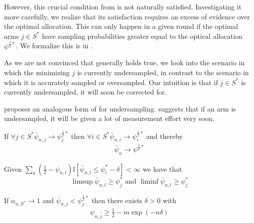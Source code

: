 However, this crucial condition from  is not naturally
satisfied. Investigating it more carefully, we realize that its satisfaction
requires an excess of evidence over the optimal allocation. This can only happen
in a given round if the optimal arms $j \in S^*$ have sampling probabilities
greater equal to the optical allocation $\psi^{\frac{1}{2}*}$. We formalize
this is in .

As we are not convinced that  generally holds true, we
look into the scenario in which the minimizing $j$ is currently undersampled, in
contrast to the scenario in which it is accurately sampled or oversampled. Our
intuition is that if $j \in S^*$ is currently undersampled, it will soon be
corrected for.

 proposes an analogous form of
 for undersampling.
 suggests that if an arm is undersampled, it will
be given a lot of measurement effort very soon.
\begin{lemma}\label{lemma:if_converged_then_converged}
  If $\forall j \in S^* \bar{\psi}_{n, j} \rightarrow \psi^{\frac{1}{2}*}_j$
  then $\forall i \in S^* \bar{\psi}_{n, i} \rightarrow \psi^{\frac{1}{2}*}_i$
  and thereby
  \begin{align}
    \bar{\psi}_n \rightarrow \psi^{\frac{1}{2}*}
  \end{align}
\end{lemma}
\begin{lemma}\label{lemma:limsup_undersampling}
  Given $\sum_n(\frac{1}{2} - \psi_{n, l}) \mathbb{I}[\bar{\psi}_{n, l} \leq
    \psi_l^* - \delta] < \infty$ we have that
  \[\limsup \bar{\psi}_{n, l} \geq \psi_j^* \text{ and } \liminf \bar{\psi}_{n,
      l} \geq \psi_j^*\]
\end{lemma}
\begin{lemma}\label{lemma:psi_undersampled}
  If $\alpha_{n, S^*} \rightarrow 1$ and $\bar{\psi}_{n, j} < \psi^{\frac{1}{2}*}_j$ then there exists $\delta > 0$
  with
  \begin{align}
    \psi_{n, \hat{j}} \geq \frac{1}{2} - m\exp(-n \delta)
  \end{align}
\end{lemma}

